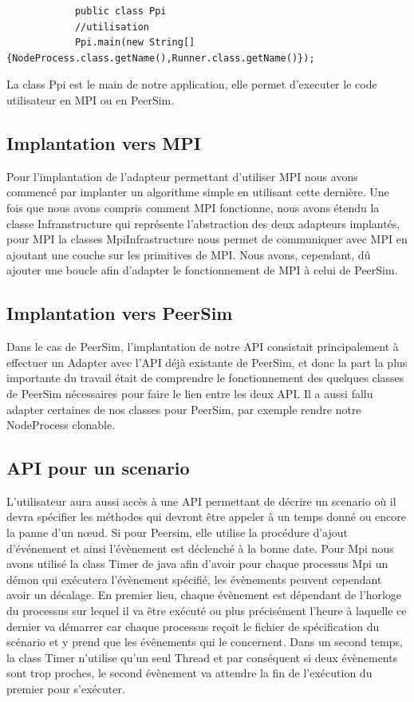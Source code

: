 \documentclass{article}
\begin{document}
			\begin{lstlisting}
			public class Ppi
			//utilisation
			Ppi.main(new String[] {NodeProcess.class.getName(),Runner.class.getName()});
			\end{lstlisting}
			La class Ppi est le main de notre application, elle permet d'executer le code utilisateur en MPI ou en PeerSim.

			\subsection{Implantation vers MPI}
			Pour l'implantation de l'adapteur permettant d'utiliser MPI nous avons commencé par implanter un algorithme simple en utilisant cette dernière.
			Une fois que nous avons compris comment MPI fonctionne, nous avons étendu la classe Infranstructure qui représente l'abstraction des deux adapteurs implantés, pour MPI la classes MpiInfrastructure nous permet de communiquer avec MPI en ajoutant  une couche sur les primitives de MPI.
			Nous avons, cependant, dû ajouter une boucle  afin d'adapter le fonctionnement de MPI à celui de PeerSim.
			\subsection{Implantation vers PeerSim}
			Dans le cas de PeerSim, l'implantation de notre API consistait principalement à effectuer un Adapter avec l'API déjà existante de PeerSim, et donc la part la plus importante du travail était de comprendre le fonctionnement des quelques classes de PeerSim nécessaires pour faire le lien entre les deux API. Il a aussi fallu adapter certaines de nos classes pour PeerSim, par exemple rendre notre NodeProcess clonable. 
			\subsection{API pour un scenario}
			L'utilisateur aura aussi accès à une API permettant de décrire un scenario où il devra spécifier les méthodes qui devront être appeler à un temps donné ou encore 
			la panne d'un nœud. 
			\newline
			Si pour Peersim, elle utilise la procédure d'ajout d'événement et ainsi l'évènement est déclenché à la bonne date.
			\newline
			Pour Mpi nous avons utilisé la class Timer de java afin d'avoir pour chaque processus Mpi un démon qui exécutera l'évènement spécifié, les évènements peuvent cependant avoir un décalage.
			\newline
			En premier lieu, chaque évènement est dépendant de l'horloge du processus sur lequel il va être exécuté ou plus précisément l'heure à laquelle ce dernier va démarrer car chaque processus reçoit le fichier de spécification du scénario et y prend que les évênements qui le concernent.
			\newline
			Dans un second temps, la class Timer n'utilise qu'un seul Thread et par conséquent si deux évènements sont trop proches, le second évènement va attendre la fin de l'exécution du premier pour s'exécuter.
\end{document}
